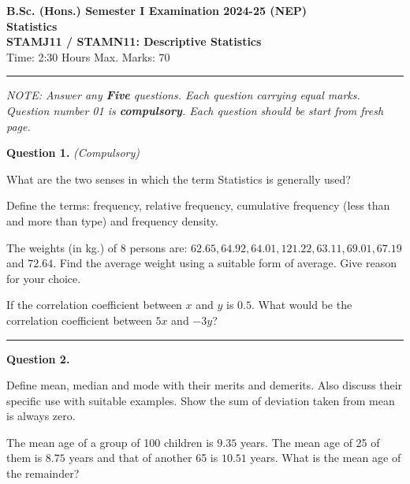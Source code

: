 \documentclass[11pt,a4paper]{article}
\begin{document}
\begin{center}
  {\large\bfseries B.Sc. (Hons.) Semester I Examination 2024-25 (NEP)}\\[4pt]
  {\large\bfseries Statistics}\\[4pt]
  {\large\bfseries STAMJ11 / STAMN11: Descriptive Statistics}\\[4pt]
  {\normalsize Time: 2:30 Hours \hfill Max. Marks: 70}
\end{center}

\rule{\linewidth}{0.4pt}\smallskip



\noindent   \textit{NOTE: Answer any   \textbf{Five} questions. Each question carrying equal marks. Question number 01 is   \textbf{compulsory}. Each question should be start from fresh page.}
\bigskip




\noindent   \textbf{Question 1.}   \textit{(Compulsory)}

\begin{parts}
  \item What are the two senses in which the term Statistics is generally used?

  \item Define the terms: frequency, relative frequency, cumulative frequency (less than and more than type) and frequency density.

  \item The weights (in kg.) of 8 persons are: $62.65, 64.92, 64.01, 121.22, 63.11, 69.01, 67.19$ and $72.64$. Find the average weight using a suitable form of average. Give reason for your choice.

  \item If the correlation coefficient between $x$ and $y$ is $0.5$. What would be the correlation coefficient between $5x$ and $-3y$?
\end{parts}

\medskip\rule{\linewidth}{0.2pt}\medskip




\noindent   \textbf{Question 2.}

\begin{parts}
  \item Define mean, median and mode with their merits and demerits. Also discuss their specific use with suitable examples. Show the sum of deviation taken from mean is always zero.

  \item The mean age of a group of 100 children is $9.35$ years. The mean age of 25 of them is $8.75$ years and that of another 65 is $10.51$ years. What is the mean age of the remainder?
\end{parts}
\end{document}
